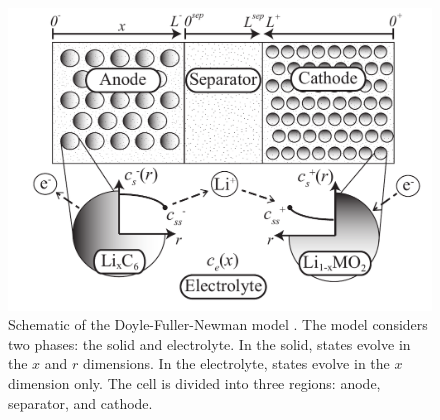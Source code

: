 \documentclass[12pt]{article}
\begin{document}
\begin{figure}[t]
  \centering
  \includegraphics[trim = 0.4in 0.1in 0.15in 0.05in, clip, width=4.5in]{dfn-schematic.pdf}
  \caption{Schematic of the Doyle-Fuller-Newman model \cite{Thomas2002}. The model considers two phases: the solid and electrolyte. In the solid, states evolve in the $x$ and $r$ dimensions. In the electrolyte, states evolve in the $x$ dimension only. The cell is divided into three regions: anode, separator, and cathode.}
  \label{fig:dfn-schematic}
\end{figure}
\end{document}
